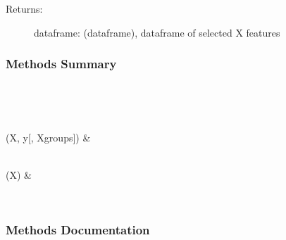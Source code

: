 \documentclass[letterpaper,10pt,english]{sphinxmanual}
\begin{document}
\begin{fulllineitems}
\begin{description}
\begin{description}
\begin{description}
\item[{Returns:}] \leavevmode
dataframe: (dataframe), dataframe of selected X features

\end{description}

\end{description}

\end{description}
\subsubsection*{Methods Summary}


\begin{savenotes}\sphinxatlongtablestart\begin{longtable}[c]{}
\hline

\endfirsthead

%
{}\\
\hline

\endhead

\hline
{}\\
\endfoot

\endlastfoot

{\hyperref[\detokenize{api/mastml.feature_selectors.MASTMLFeatureSelector:mastml.feature_selectors.MASTMLFeatureSelector.fit}]{}}(X, y{[}, Xgroups{]})
&

\\
\hline
{\hyperref[\detokenize{api/mastml.feature_selectors.MASTMLFeatureSelector:mastml.feature_selectors.MASTMLFeatureSelector.transform}]{}}(X)
&

\\
\hline
\end{longtable}\sphinxatlongtableend\end{savenotes}
\subsubsection*{Methods Documentation}

\begin{fulllineitems}
\label{\detokenize{api/mastml.feature_selectors.MASTMLFeatureSelector:mastml.feature_selectors.MASTMLFeatureSelector.fit}}
\end{fulllineitems}


\end{fulllineitems}
\end{document}
